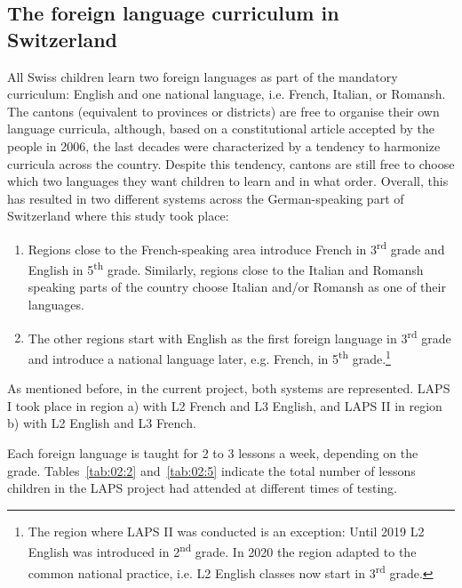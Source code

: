 \documentclass[output=paper]{langsci/langscibook}
\begin{document}
\subsection{The foreign language curriculum in Switzerland}\label{sec:02:2.1}


All Swiss children learn two foreign languages as part of the mandatory curriculum: English and one national language, i.e. French, Italian, or Romansh. The cantons (equivalent to provinces or districts) are free to organise their own language curricula, although, based on a constitutional article accepted by the people in 2006, the last decades were characterized by a tendency to harmonize curricula across the country. Despite this tendency, cantons are still free to choose which two languages they want children to learn and in what order. Overall, this has resulted in two different systems across the German-speaking part of Switzerland where this study took place:

\begin{enumerate}[label=\alph*.]
\item Regions close to the French-speaking area introduce French in 3\textsuperscript{rd} grade and English in 5\textsuperscript{th} grade. Similarly, regions close to the Italian and Romansh speaking parts of the country choose Italian and/or Romansh as one of their languages.
\item The other regions start with English as the first foreign language in 3\textsuperscript{rd} grade and introduce a national language later, e.g. French, in 5\textsuperscript{th} grade.\footnote{The region where LAPS II was conducted is an exception: Until 2019 L2 English was introduced in 2\textsuperscript{nd} grade. In 2020 the region adapted to the common national practice, i.e. L2 English classes now start in 3\textsuperscript{rd} grade.}
\end{enumerate}

As mentioned before, in the current project, both systems are represented. LAPS I took place in region a) with L2 French and L3 English, and LAPS II in region b) with L2 English and L3 French.

Each foreign language is taught for 2 to 3 lessons a week, depending on the grade. Tables~\ref{tab:02:2} and~\ref{tab:02:5} indicate the total number of lessons children in the LAPS project had attended at different times of testing. 
\end{document}
